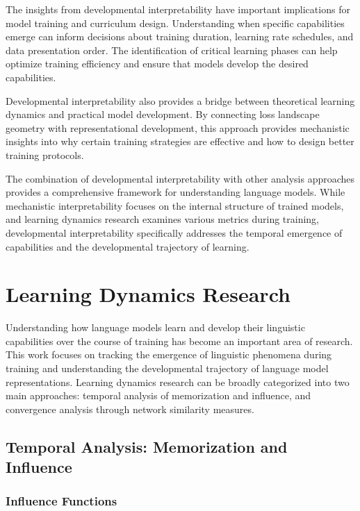 The insights from developmental interpretability have important implications for model training and curriculum design. Understanding when specific capabilities emerge can inform decisions about training duration, learning rate schedules, and data presentation order. The identification of critical learning phases can help optimize training efficiency and ensure that models develop the desired capabilities.

Developmental interpretability also provides a bridge between theoretical learning dynamics and practical model development. By connecting loss landscape geometry with representational development, this approach provides mechanistic insights into why certain training strategies are effective and how to design better training protocols.

The combination of developmental interpretability with other analysis approaches provides a comprehensive framework for understanding language models. While mechanistic interpretability focuses on the internal structure of trained models, and learning dynamics research examines various metrics during training, developmental interpretability specifically addresses the temporal emergence of capabilities and the developmental trajectory of learning.

\section{Learning Dynamics Research}

Understanding how language models learn and develop their linguistic capabilities over the course of training has become an important area of research. This work focuses on tracking the emergence of linguistic phenomena during training and understanding the developmental trajectory of language model representations. Learning dynamics research can be broadly categorized into two main approaches: temporal analysis of memorization and influence, and convergence analysis through network similarity measures.

\subsection{Temporal Analysis: Memorization and Influence}

\subsubsection{Influence Functions}


